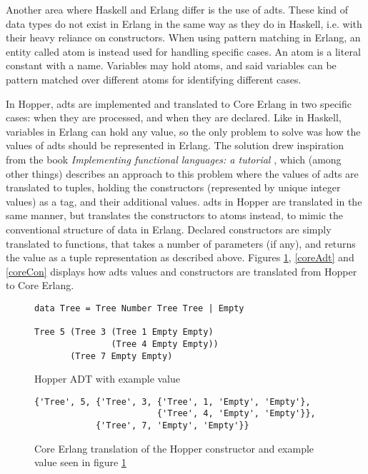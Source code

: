 Another area where Haskell and Erlang differ is the use of \glspl{adt}. These kind  %
of data types do not exist in Erlang in the same way as they do in Haskell, i.e. with their heavy reliance
on constructors. When using pattern matching in Erlang, an entity called atom is instead used for
handling specific cases. An atom is a literal constant with a name. Variables may hold atoms, and said variables can be pattern matched over different atoms for identifying different cases.

In Hopper, \glspl{adt} are implemented and translated to Core Erlang in two specific cases: when they are processed, and when they are declared. Like in Haskell, variables in Erlang can
hold any value, so the only problem to solve was how the values of \glspl{adt} should be represented in Erlang. The solution drew inspiration from the book \textit{Implementing functional languages: a tutorial} \cite{FunTutorial}, which (among other things) describes an approach to this problem where the values of \glspl{adt} are translated to tuples, holding the constructors (represented by unique integer values) as a tag, and their additional values. \Glspl{adt} in Hopper are translated in the same manner, but translates the constructors to atoms instead, to mimic the conventional structure of data in Erlang. Declared constructors are simply translated to functions, that takes a number of parameters (if any), and returns the value as a tuple representation as described above. Figures \ref{lst:hopperAdt}, \ref{coreAdt} and \ref{coreCon} displays how \glspl{adt} values and constructors are translated from Hopper to Core Erlang.

\begin{figure}[!htb]
\centering
\begin{lstlisting} 
data Tree = Tree Number Tree Tree | Empty

Tree 5 (Tree 3 (Tree 1 Empty Empty) 
               (Tree 4 Empty Empty)) 
       (Tree 7 Empty Empty)
\end{lstlisting}
\caption{Hopper ADT with example value}
\label{lst:hopperAdt}
\end{figure}

\begin{figure}[!htb]
\centering
\begin{lstlisting} 
{'Tree', 5, {'Tree', 3, {'Tree', 1, 'Empty', 'Empty'},
                        {'Tree', 4, 'Empty', 'Empty'}},
            {'Tree', 7, 'Empty', 'Empty'}}
\end{lstlisting}
\caption[Core Erlang translation of constructor and example value]
 {Core Erlang translation of the Hopper constructor and example value seen in figure \ref{lst:hopperAdt}}
\label{lst:coreAdt}
\end{figure}

